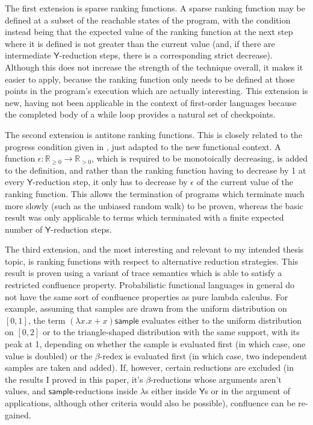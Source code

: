 \documentclass[titlepage]{article}
\newcommand{\tY}{\mathsf{Y}}
\newcommand{\tsample}{\mathsf{sample}}
\begin{document}
The first extension is sparse ranking functions. A sparse ranking function may be defined at a subset of the reachable states of the program, with the condition instead being that the expected value of the ranking function at the next step where it is defined is not greater than the current value (and, if there are intermediate $\tY$-reduction steps, there is a corresponding strict decrease). Although this does not increase the strength of the technique overall, it makes it easier to apply, because the ranking function only needs to be defined at those points in the program's execution which are actually interesting. This extension is new, having not been applicable in the context of first-order languages because the completed body of a while loop provides a natural set of checkpoints.

The second extension is antitone ranking functions. This is closely related to the progress condition given in \cite{mciver2017new}, just adapted to the new functional context. A function $\epsilon : \mathbb R_{\geq 0} \to \mathbb R_{> 0}$, which is required to be monotoically decreasing, is added to the definition, and rather than the ranking function having to decrease by 1 at every $\tY$-reduction step, it only has to decrease by $\epsilon$ of the current value of the ranking function. This allows the termination of programs which terminate much more slowly (such as the unbiased random walk) to be proven, whereas the basic result was only applicable to terms which terminated with a finite expected number of $\tY$-reduction steps.

The third extension, and the most interesting and relevant to my intended thesis topic, is ranking functions with respect to alternative reduction strategies. This result is proven using a variant of trace semantics which is able to satisfy a restricted confluence property. Probabilistic functional languages in general do not have the same sort of confluence properties as pure lambda calculus. For example, assuming that samples are drawn from the uniform distribution on $[0,1]$, the term $(\lambda x. x + x) \tsample$ evaluates either to the uniform distribution on $[0,2]$ or to the triangle-shaped distribution with the same support, with its peak at 1, depending on whether the sample is evaluated first (in which case, one value is doubled) or the $\beta$-redex is evaluated first (in which case, two independent samples are taken and added). If, however, certain reductions are excluded (in the results I proved in this paper, it's $\beta$-reductions whose arguments aren't values, and $\tsample$-reductions inside $\lambda$s either inside $\tY$s or in the argument of applications, although other criteria would also be possible), confluence can be re-gained.
\end{document}
